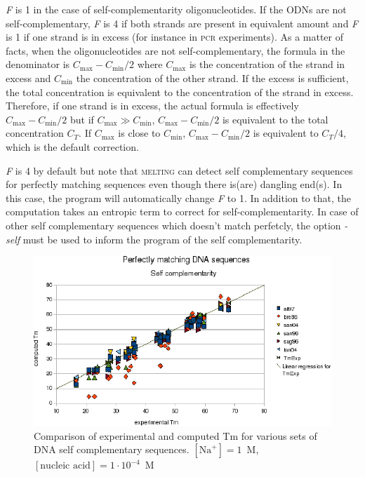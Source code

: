 \documentclass{article}
\begin{document}
\textit{F} is 1 in the case of self-complementarity oligonucleotides. If the
ODNs are not self-complementary, \textit{F} is 4 if both strands are present in
equivalent amount and \textit{F} is 1 if one strand is in excess (for instance
in \textsc{pcr} experiments).  As a matter of facts, when the oligonucleotides are not self-complementary, 
the formula in the denominator is $C_{\mbox{max}} - C_{\mbox{min}}/2$ where $C_{\mbox{max}}$ is the concentration of the strand in excess
and $C_{\mbox{min}}$ the concentration of the other strand. If the excess is sufficient, the total concentration is equivalent to the concentration of the strand in excess. Therefore, if one strand is in excess, the actual formula is effectively $C_{\mbox{max}} -
C_{\mbox{min}}/2$ but if $C_{\mbox{max}} \gg C_{\mbox{min}}$, $C_{\mbox{max}}
- C_{\mbox{min}}/2$ is equivalent to the total concentration $C_T$.  If $C_{\mbox{max}}$ is close
to $C_{\mbox{min}}$, $C_{\mbox{max}} - C_{\mbox{min}}/2$ is equivalent to $C_T/4$, which is the default
correction.

\textit{F} is 4 by default but note that \textsc{melting} can detect self complementary sequences 
for perfectly matching sequences even though there is(are) dangling end(s). In this case, the program will 
automatically change \textit{F} to 1. In addition to that, the computation takes an entropic term to correct 
for self-complementarity.
In case of other self complementary sequences which doesn't match perfetcly, the option \textit{-self} must be
used to inform the program of the self complementarity.

\begin{figure}[h]
\includegraphics[width=1\linewidth]{images/DNASelfComplementarity}
\caption{Comparison of experimental and computed Tm for various sets of
 DNA self complementary sequences. $[\mbox{Na}^+] = 1$~M, $[\mbox{nucleic acid}] = 1\cdot{}10^{-4}$~M}
\end{figure} 
\end{document}
